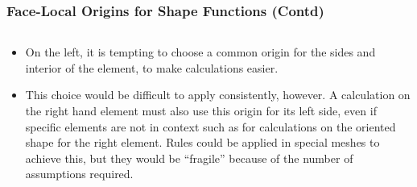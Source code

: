 \documentclass[compress]{beamer}
\begin{document}
\begin{frame}
  \frametitle{Face-Local Origins for Shape Functions (Contd)}
  \begin{columns}
  \end{columns}
  \begin{itemize}[<+->]
    \item On the left, it is tempting to choose a common origin for the sides and interior of the element, to make calculations easier.
    \item This choice would be difficult to apply consistently, however. A calculation on the right hand element must also use this origin
      for its left side, even if specific elements are not in context such as for calculations on the oriented shape for the right element.
      Rules could be applied in special meshes to achieve this, but they would be ``fragile'' because of the number of assumptions required.
  \end{itemize}
\end{frame}
\end{document}
